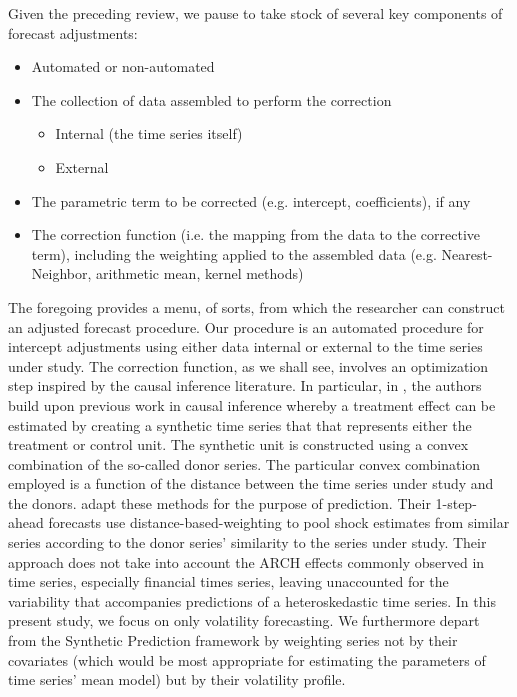 \documentclass[11pt]{article}
\theoremstyle{definition}
\begin{document}
Given the preceding review, we pause to take stock of several key components of forecast adjustments:

\begin{itemize}
  \item Automated or non-automated
  \item The collection of data assembled to perform the correction
  \begin{itemize}
    \item Internal (the time series itself)
    \item External
  \end{itemize}
  \item The parametric term to be corrected (e.g. intercept, coefficients), if any
  \item The correction function (i.e. the mapping from the data to the corrective term), including the weighting applied to the assembled data (e.g. Nearest-Neighbor, arithmetic mean, kernel methods)
\end{itemize}
The foregoing provides a menu, of sorts, from which the researcher can construct an adjusted forecast procedure.  Our procedure is an automated procedure for intercept adjustments using either data internal or external to the time series under study.  The correction function, as we shall see, involves an optimization step inspired by the causal inference literature.  In particular, in \citet{abadie2010synthetic}, the authors build upon previous work in causal inference whereby a treatment effect can be estimated by creating a synthetic time series that that represents either the treatment or control unit.  The synthetic unit is constructed using a convex combination of the so-called donor series.  The particular convex combination employed is a function of the distance between the time series under study and the donors.  \citet{lin2021minimizing} adapt these methods for the purpose of prediction.  Their 1-step-ahead forecasts use distance-based-weighting to pool shock estimates from similar series according to the donor series' similarity to the series under study.  Their approach does not take into account the ARCH effects commonly observed in time series, especially financial times series, leaving unaccounted for the variability that accompanies predictions of a heteroskedastic time series.  In this present study, we focus on only volatility forecasting.  We furthermore depart from the Synthetic Prediction framework by weighting series not by their covariates (which would be most appropriate for estimating the parameters of time series' mean model) but by their volatility profile.  
\end{document}
